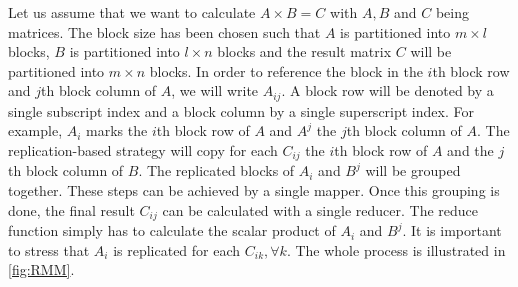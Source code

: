 Let us assume that we want to calculate $A \times B = C$ with $A,B$ and $C$ being matrices. 
The block size has been chosen such that $A$ is partitioned into $m\times l$ blocks, $B$ is partitioned into $l \times n$ blocks and the result matrix $C$ will be partitioned into $m\times n$ blocks. 
In order to reference the block in the $i$th block row and $j$th block column of $A$, we will write $A_{ij}$. 
A block row will be denoted by a single subscript index and a block column by a single superscript index. 
For example, $A_i$ marks the $i$th block row of $A$ and $A^j$ the $j$th block column of $A$. 
The replication-based strategy will copy for each $C_{ij}$ the $i$th block row of $A$ and the $j$th block column of $B$. 
The replicated blocks of $A_i$ and $B^j$ will be grouped together. 
These steps can be achieved by a single mapper. 
Once this grouping is done, the final result $C_{ij}$ can be calculated with a single reducer. 
The reduce function simply has to calculate the scalar product of $A_i$ and $B^j$. 
It is important to stress that $A_i$ is replicated for each $C_{ik},\forall k$. 
The whole process is illustrated in \cref{fig:RMM}.
